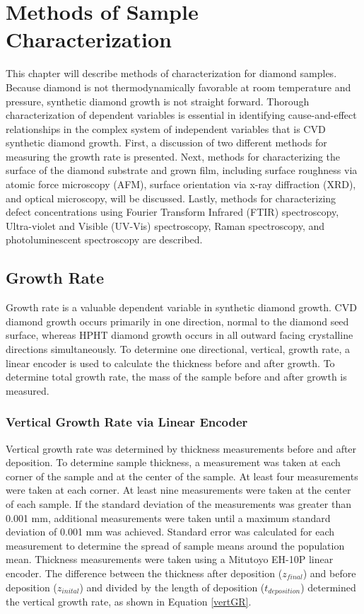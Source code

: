 \chapter{Methods of Sample Characterization}
\label{chMethods}
\indent

This chapter will describe methods of characterization for diamond samples. Because diamond is not thermodynamically favorable at room temperature and pressure, synthetic diamond growth is not straight forward. Thorough characterization of dependent variables is essential in identifying cause-and-effect relationships in the complex system of independent variables that is CVD synthetic diamond growth. First, a discussion of two different methods for measuring the growth rate is presented. Next, methods for characterizing the surface of the diamond substrate and grown film, including surface roughness via atomic force microscopy (AFM), surface orientation via x-ray diffraction (XRD), and optical microscopy, will be discussed. Lastly, methods for characterizing defect concentrations using Fourier Transform Infrared (FTIR) spectroscopy, Ultra-violet and Visible (UV-Vis) spectroscopy, Raman spectroscopy, and photoluminescent spectroscopy are described.

\section{Growth Rate}
\label{growthrate}
\indent

Growth rate is a valuable dependent variable in synthetic diamond growth. CVD diamond growth occurs primarily in one direction, normal to the diamond seed surface, whereas HPHT diamond growth occurs in all outward facing crystalline directions simultaneously. To determine one directional, vertical, growth rate, a linear encoder is used to calculate the thickness before and after growth. To determine total growth rate, the mass of the sample before and after growth is measured.

\subsection{Vertical Growth Rate via Linear Encoder}
\label{thickness}
\indent

Vertical growth rate was determined by thickness measurements before and after deposition. To determine sample thickness, a measurement was taken at each corner of the sample and at the center of the sample. At least four measurements were taken at each corner. At least nine measurements were taken at the center of each sample. If the standard deviation of the measurements was greater than 0.001 mm, additional measurements were taken until a maximum standard deviation of 0.001 mm was achieved. Standard error was calculated for each measurement to determine the spread of sample means around the population mean. Thickness measurements were taken using a Mitutoyo EH-10P linear encoder. The difference between the thickness after deposition ($z_{final}$) and before deposition ($z_{inital}$) and divided by the length of deposition ($t_{deposition}$) determined the vertical growth rate, as shown in Equation \ref{vertGR}.

